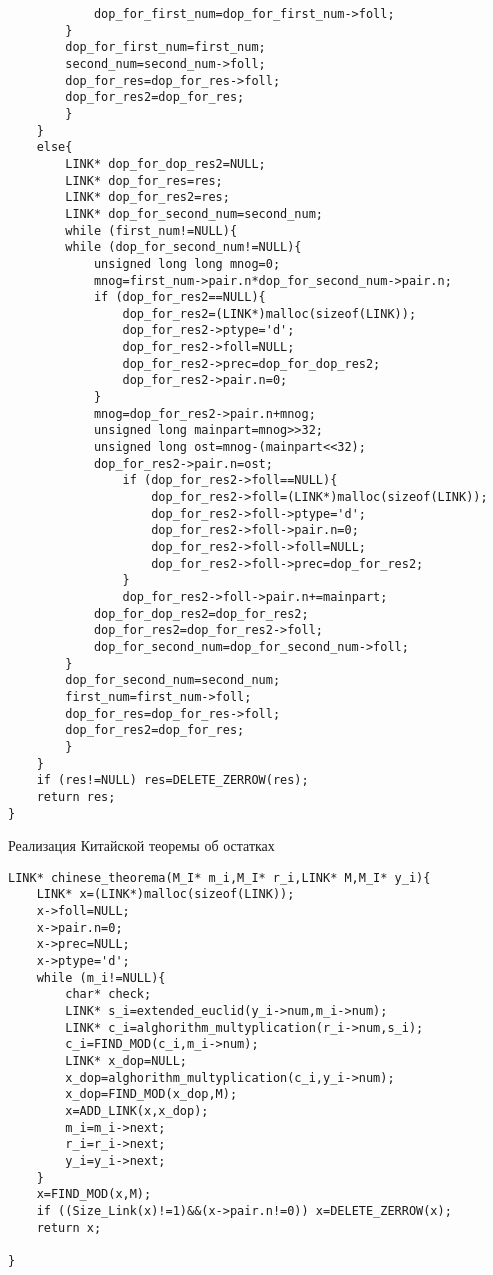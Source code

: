 \documentclass[14pt, russian]{scrartcl}
\begin{document}
\begin{code}
\begin{verbatim}
            dop_for_first_num=dop_for_first_num->foll;
        }
        dop_for_first_num=first_num;
        second_num=second_num->foll;
        dop_for_res=dop_for_res->foll;
        dop_for_res2=dop_for_res;
        }
    }
    else{
        LINK* dop_for_dop_res2=NULL;
        LINK* dop_for_res=res;
        LINK* dop_for_res2=res;
        LINK* dop_for_second_num=second_num;
        while (first_num!=NULL){
        while (dop_for_second_num!=NULL){
            unsigned long long mnog=0;
            mnog=first_num->pair.n*dop_for_second_num->pair.n;
            if (dop_for_res2==NULL){
                dop_for_res2=(LINK*)malloc(sizeof(LINK));
                dop_for_res2->ptype='d';
                dop_for_res2->foll=NULL;
                dop_for_res2->prec=dop_for_dop_res2;
                dop_for_res2->pair.n=0;
            }
            mnog=dop_for_res2->pair.n+mnog;
            unsigned long mainpart=mnog>>32;
            unsigned long ost=mnog-(mainpart<<32);
            dop_for_res2->pair.n=ost;
                if (dop_for_res2->foll==NULL){
                    dop_for_res2->foll=(LINK*)malloc(sizeof(LINK));
                    dop_for_res2->foll->ptype='d';
                    dop_for_res2->foll->pair.n=0;
                    dop_for_res2->foll->foll=NULL;
                    dop_for_res2->foll->prec=dop_for_res2;
                }
                dop_for_res2->foll->pair.n+=mainpart;
            dop_for_dop_res2=dop_for_res2;
            dop_for_res2=dop_for_res2->foll;
            dop_for_second_num=dop_for_second_num->foll;
        }
        dop_for_second_num=second_num;
        first_num=first_num->foll;
        dop_for_res=dop_for_res->foll;
        dop_for_res2=dop_for_res;
        }    
    }
    if (res!=NULL) res=DELETE_ZERROW(res);
    return res;
}
\end{verbatim}
\end{code}


\newpage
\begin{code}
\caption{Реализация Китайской теоремы об остатках}
\label{lst:octaladd}
\begin{verbatim}
LINK* chinese_theorema(M_I* m_i,M_I* r_i,LINK* M,M_I* y_i){
    LINK* x=(LINK*)malloc(sizeof(LINK));
    x->foll=NULL;
    x->pair.n=0;
    x->prec=NULL;
    x->ptype='d';
    while (m_i!=NULL){
        char* check;
        LINK* s_i=extended_euclid(y_i->num,m_i->num);
        LINK* c_i=alghorithm_multyplication(r_i->num,s_i);
        c_i=FIND_MOD(c_i,m_i->num);
        LINK* x_dop=NULL;
        x_dop=alghorithm_multyplication(c_i,y_i->num);
        x_dop=FIND_MOD(x_dop,M);
        x=ADD_LINK(x,x_dop);
        m_i=m_i->next;
        r_i=r_i->next;
        y_i=y_i->next;
    }
    x=FIND_MOD(x,M);
    if ((Size_Link(x)!=1)&&(x->pair.n!=0)) x=DELETE_ZERROW(x);
    return x;

}
\end{verbatim}
\end{code}
\end{document}
